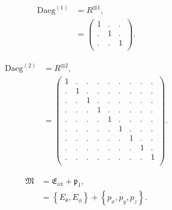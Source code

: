 \documentclass[a4paper,11pt,twoside,openright]{book}
\def\lthtmlcheckvsize{\ifdim\ht\sizebox<\vsize 
  \ifdim\wd\sizebox<\hsize\expandafter\hfill\fi \expandafter\vfill
  \else\expandafter\vss\fi}%
\begin{document}
{\newpage\clearpage
\setcounter{equation}{3}
%
\begin{subequations}\begin{align}
\textrm{Daeg}^{(1)}&= R^{\otimes 1} , \\
&= \begin{pmatrix}
1 & . & . \\
. & 1 & . \\
. & . & 1 \\
\end{pmatrix}.
\end{align}\end{subequations}%
\lthtmldisplayZ
\lthtmlcheckvsize\clearpage}

{\newpage\clearpage
\setcounter{equation}{4}
%
\begin{subequations}\begin{align}
\textrm{Daeg}^{(2)}&= R^{\otimes 2} , \\
&= \begin{pmatrix}
1 & . & . & . & . & . & . & . & . \\
. & 1 & . & . & . & . & . & . & . \\
. & . & 1 & . & . & . & . & . & . \\
. & . & . & 1 & . & . & . & . & . \\
. & . & . & . & 1 & . & . & . & . \\
. & . & . & . & . & 1 & . & . & . \\
. & . & . & . & . & . & 1 & . & . \\
. & . & . & . & . & . & . & 1 & . \\
. & . & . & . & . & . & . & . & 1 \\
\end{pmatrix}.
\end{align}\end{subequations}%
\lthtmldisplayZ
\lthtmlcheckvsize\clearpage}

{\newpage\clearpage
\setcounter{equation}{5}
%
\begin{subequations}\begin{align}
\mathfrak{M}&= \mathfrak{E}_{\textrm{ax}}+ \mathfrak{p}_1, \\
&= \left\{ E_\theta , E_\phi \right\}+ \left\{ p_x, p_y, p_z\right\}.
\end{align}\end{subequations}%
\lthtmldisplayZ
\lthtmlcheckvsize\clearpage}
\end{document}
